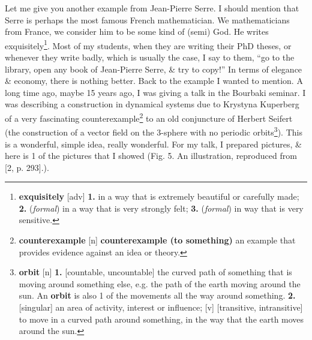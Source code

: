 \documentclass[oneside]{book}
\numberwithin{equation}{section}
\begin{document}
Let me give you another example from Jean-Pierre Serre. I should mention that Serre is perhaps the most famous French mathematician. We mathematicians from France, we consider him to be some kind of (semi) God. He writes exquisitely\footnote{\textbf{exquisitely} [adv] \textbf{1.} in a way that is extremely beautiful or carefully made; \textbf{2.} (\textit{formal}) in a way that is very strongly felt; \textbf{3.} (\textit{formal}) in way that is very sensitive.}. Most of my students, when they are writing their PhD theses, or whenever they write badly, which is usually the case, I say to them, ``go to the library, open any book of Jean-Pierre Serre, \& try to copy!'' In terms of elegance \& economy, there is nothing better. Back to the example I wanted to mention. A long time ago, maybe 15 years ago, I was giving a talk in the Bourbaki seminar. I was describing a construction in dynamical systems due to Krystyna Kuperberg of a very fascinating counterexample\footnote{\textbf{counterexample} [n] \textbf{counterexample (to something)} an example that provides evidence against an idea or theory.} to an old conjuncture of Herbert Seifert (the construction of a vector field on the 3-sphere with no periodic orbits\footnote{\textbf{orbit} [n] \textbf{1.} [countable, uncountable] the curved path of something that is moving around something else, e.g. the path of the earth moving around the sun. An \textbf{orbit} is also 1 of the movements all the way around something. \textbf{2.} [singular] an area of activity, interest or influence; [v] [transitive, intransitive] to move in a curved path around something, in the way that the earth moves around the sun.}). This is a wonderful, simple idea, really wonderful. For my talk, I prepared pictures, \& here is 1 of the pictures that I showed (\textsf{Fig. 5. An illustration, reproduced from [2, p. 293].}).
\end{document}
